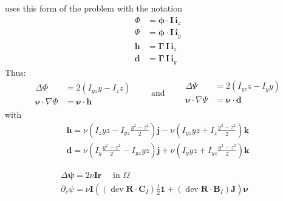 \begin{Quote}
\cite{pilkey2003analysis} uses this form of the problem with the notation 
\begin{equation*}
    \begin{aligned}
        \Phi &= \bm{\phi}\cdot \mathbf{I}\,\mathbf{i}_z \\
        \Psi &= \bm{\phi}\cdot \mathbf{I}\,\mathbf{i}_y\\
        \mathbf{h} &= \bm{\Gamma}\,\mathbf{I}\,\mathbf{i}_z \\
        \mathbf{d} &= \bm{\Gamma} \, \mathbf{I}\, \mathbf{i}_y
    \end{aligned}
\end{equation*}
Thus:
\begin{equation}
\begin{aligned}
\Delta \Phi&=2\left(I_{y z} y-I_z z\right)  \\
   \bm{\nu} \cdot \nabla \Phi&=\bm{\nu}\cdot \mathbf{h}
\end{aligned}
\qquad\text{and}\qquad
\begin{aligned}
\Delta \Psi&=2\left(I_{y z} z-I_y y\right) \\
\bm{\nu} \cdot \nabla \Psi&=\bm{\nu} \cdot \mathbf{d} \\
\end{aligned}
\end{equation}
with
\begin{equation}
\begin{aligned}
\mathbf{h}=\nu\left(I_z y z-I_{y z} \frac{y^2-z^2}{2}\right) \mathbf{j}-\nu\left(I_{y z} y z+I_z \frac{y^2-z^2}{2}\right) \mathbf{k} \\
\mathbf{d}=\nu\left(I_y \frac{y^2-z^2}{2}-I_{y z} y z\right) \mathbf{j}+\nu\left(I_y y z+I_{y z} \frac{y^2-z^2}{2}\right) \mathbf{k}
\end{aligned}
\end{equation}

\begin{equation}
\begin{aligned}
\Delta \bm{\psi}=2 \nu \mathbf{I}\bm{r} \quad \text { in } \Omega \\
\partial_\nu \psi=\nu \mathbf{I}\left(\left(\operatorname{dev} \bm{R}\cdot \mathbf{C}_I\right) \frac{1}{2} \mathbf{1}+\left(\operatorname{dev} \bm{R}\cdot \mathbf{B}_I\right) \mathbf{J}\right) \bm{\nu} &
\end{aligned}
\end{equation}
\end{Quote}


